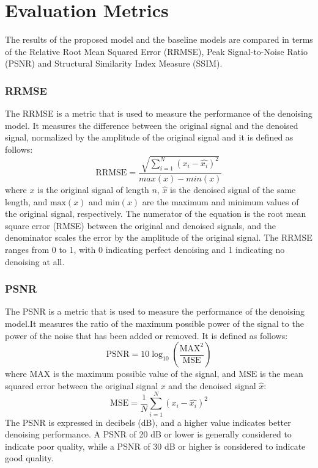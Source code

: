 \documentclass[a4paper]{sapthesis}
\begin{document}
\section{Evaluation Metrics}
The results of the proposed model and the baseline models are compared 
in terms of the Relative Root Mean Squared Error (RRMSE), Peak 
Signal-to-Noise Ratio (PSNR) and Structural Similarity Index Measure (SSIM).
\subsubsection{RRMSE}
The RRMSE is a metric that is used to measure the performance of the
denoising model. It measures the difference between the original signal
 and the denoised signal, normalized by the amplitude of the original 
 signal and it is defined as follows:
\begin{equation}
\text{RRMSE} = \frac{\sqrt{\sum_{i=1}^{N} (x_i - \hat{x_i})^2}}{max(x) - min(x)}
\end{equation}
where $x$ is the original signal of length $n$, $\hat{x}$ is the denoised 
signal of the same length, and $\text{max}(x)$ and $\text{min}(x)$ are the 
maximum and minimum values of the original signal, respectively. The 
numerator of the equation is the root mean square error (RMSE) between 
the original and denoised signals, and the denominator scales the error 
by the amplitude of the original signal.\newline
The RRMSE ranges from 0 to 1, 
with 0 indicating perfect denoising and 1 indicating no denoising at all.
\subsubsection{PSNR}
The PSNR is a metric that is used to measure the performance of the
denoising model.It measures the ratio of the maximum possible power of 
the signal to the power of the noise that has been added or removed. 
It is defined as follows:
\begin{equation}
\text{PSNR} = 10 \log_{10} \left(\frac{\text{MAX}^2}{\text{MSE}}\right)
\end{equation}
where $\text{MAX}$ is the maximum possible value of the signal, 
and $\text{MSE}$ is the mean squared error between the original 
signal $x$ and the denoised signal $\hat{x}$:
\begin{equation}
\text{MSE} = \frac{1}{N}\sum_{i=1}^{N} (x_i - \hat{x_i})^2
\end{equation}
The PSNR is expressed in decibels (dB), and a higher value indicates 
better denoising performance. A PSNR of 20 dB or lower is generally 
considered to indicate poor quality, while a PSNR of 30 dB or higher 
is considered to indicate good quality.
\end{document}
